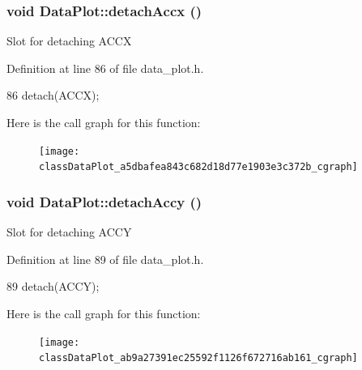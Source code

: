 \hypertarget{classDataPlot_a5dbafea843c682d18d77e1903e3c372b}{
\subsubsection[{detachAccx}]{\setlength{\rightskip}{0pt plus 5cm}void DataPlot::detachAccx ()}}
\label{classDataPlot_a5dbafea843c682d18d77e1903e3c372b}
Slot for detaching ACCX 

Definition at line 86 of file data\_\-plot.h.




\begin{DoxyCode}
86 { detach(ACCX); }
\end{DoxyCode}




Here is the call graph for this function:\nopagebreak
\begin{figure}[H]
\begin{center}
\leavevmode
\texttt{[image: classDataPlot\_a5dbafea843c682d18d77e1903e3c372b\_cgraph]}
\end{center}
\end{figure}


\hypertarget{classDataPlot_ab9a27391ec25592f1126f672716ab161}{
\subsubsection[{detachAccy}]{\setlength{\rightskip}{0pt plus 5cm}void DataPlot::detachAccy ()}}
\label{classDataPlot_ab9a27391ec25592f1126f672716ab161}
Slot for detaching ACCY 

Definition at line 89 of file data\_\-plot.h.




\begin{DoxyCode}
89 { detach(ACCY); }
\end{DoxyCode}




Here is the call graph for this function:\nopagebreak
\begin{figure}[H]
\begin{center}
\leavevmode
\texttt{[image: classDataPlot\_ab9a27391ec25592f1126f672716ab161\_cgraph]}
\end{center}
\end{figure}


